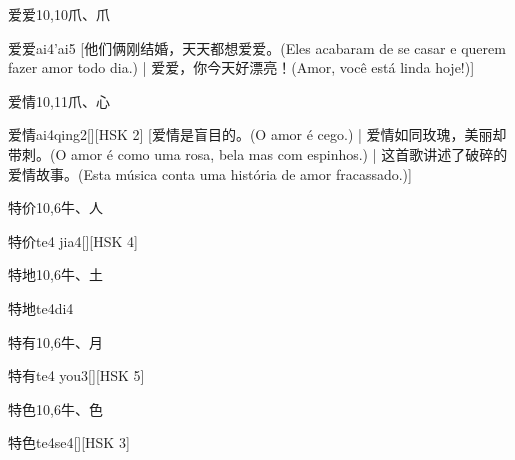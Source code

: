 \begin{entry}{爱爱}{10,10}{⽖、⽖}
  \begin{phonetics}{爱爱}{ai4'ai5}
    [他们俩刚结婚，天天都想爱爱。(Eles acabaram de se casar e querem fazer amor todo dia.) | 爱爱，你今天好漂亮！(Amor, você está linda hoje!)]
  \end{phonetics}
\end{entry}

\begin{entry}{爱情}{10,11}{⽖、⼼}
  \begin{phonetics}{爱情}{ai4qing2}[][HSK 2]
    [爱情是盲目的。(O amor é cego.) | 爱情如同玫瑰，美丽却带刺。(O amor é como uma rosa, bela mas com espinhos.)  | 这首歌讲述了破碎的爱情故事。(Esta música conta uma história de amor fracassado.)]
  \end{phonetics}
\end{entry}

\begin{entry}{特价}{10,6}{⽜、⼈}
  \begin{phonetics}{特价}{te4 jia4}[][HSK 4]
  \end{phonetics}
\end{entry}

\begin{entry}{特地}{10,6}{⽜、⼟}
  \begin{phonetics}{特地}{te4di4}
  \end{phonetics}
\end{entry}

\begin{entry}{特有}{10,6}{⽜、⽉}
  \begin{phonetics}{特有}{te4 you3}[][HSK 5]
  \end{phonetics}
\end{entry}

\begin{entry}{特色}{10,6}{⽜、⾊}
  \begin{phonetics}{特色}{te4se4}[][HSK 3]
  \end{phonetics}
\end{entry}


